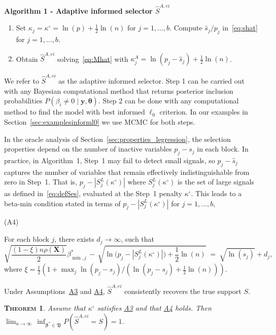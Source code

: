 \documentclass[
  12pt]{article}
\providecommand{\tightlist}{%
  \setlength{\itemsep}{0pt}\setlength{\parskip}{0pt}}\usepackage{longtable,booktabs,array}
\newcommand{\by}{\mathbf{y}}
\newcommand{\bbeta}{\boldsymbol{\beta}}
\newcommand{\btheta}{\boldsymbol{\theta}}
\newcommand{\bX}{\mathbf{X}}
\newtheorem{thm}{\textsc{Theorem}}[section]
\begin{document}
\textbf{\hypertarget{lab:AlgoAIS}{Algorithm 1} - Adaptive informed selector $\hat{S}^{A,ei}$}
\begin{enumerate}\tightlist
    \item Set $\kappa_j=\kappa^{\circ}=\ln(p)+\frac{1}{2}\ln(n)$ 
    for $j=1,\ldots,b$. Compute $\hat{s}_j/p_j$ in~\eqref{eq:shat} for $j=1,\ldots,b$.
    \item Obtain $\hat{S}^{A,ei}$ solving~\eqref{eq:Mhat} with
    $\kappa_j^{A} = \ln(p_j-\hat{s}_j)+ \tfrac{1}{2}\ln(n)$.
\end{enumerate}

We refer to $\hat{S}^{A,ei}$ as the adaptive informed selector.  
Step 1 can be carried out with any Bayesian computational method that returns posterior inclusion probabilities $P(\beta_i \neq 0 \mid \by, \btheta)$. 
Step 2 can be done with any computational method to find the model with best informed $\ell_0$ criterion.
In our examples in Section~\ref{sec:examplesinforml0} we use MCMC for both steps. 

In the oracle analysis of Section~\ref{sec:properties_legression}, the selection properties depend on the number of inactive variables $p_j-s_j$ in each block. In practice, in Algorithm~1, Step~1 may fail to detect small signals, so $p_j - \hat{s}_j$ captures the number of variables that remain effectively indistinguishable from zero in Step~1. That is, $p_j-|S_j^{L}(\kappa^\circ)|$ where $S_j^{L}(\kappa^\circ)$ is the set of large signals as defined in~\eqref{eq:defSes}, evaluated at the Step~1 penalty $\kappa^\circ$.
This leads to a beta-min condition stated in terms of $p_j-|S_j^{L}(\kappa^\circ)|$ for $j=1,\ldots,b$,

\hypertarget{lab:A4}{(A4)}\quad For each block $j$, there exists $d_j\to\infty$, such that
\begin{equation*}
        \sqrt{\frac{ (1-\xi)n\rho(\bX)}{2}}\beta_{\min,j}^* \,- \,\sqrt{\ln\big(p_j-|S^{L}_j(\kappa^{\circ})|\big)+\frac12\ln(n)} \;=\; \sqrt{\ln(s_j)} + d_j,
    \end{equation*}
where $\xi=\tfrac12(1+\max_j \ln(p_j-s_j)/(\ln(p_j-s_j)+\tfrac 12 \ln(n)))$.

Under Assumptions~\hyperlink{lab:A3}{A3} and \hyperlink{lab:A4}{A4}, $\hat{S}^{A,ei}$ consistently recovers the true support $S$.

\begin{thm}\label{theo:informedl0consist}
    Assume that $\kappa^{\circ}$ satisfies \hyperlink{lab:A3}{A3} and that \hyperlink{lab:A4}{A4} holds. Then 
$\lim_{n \to \infty} \,\inf_{\bbeta^*\in\mathfrak{B}} P(\hat{S}^{A,ei} = S) = 1$.
\end{thm}
\end{document}
